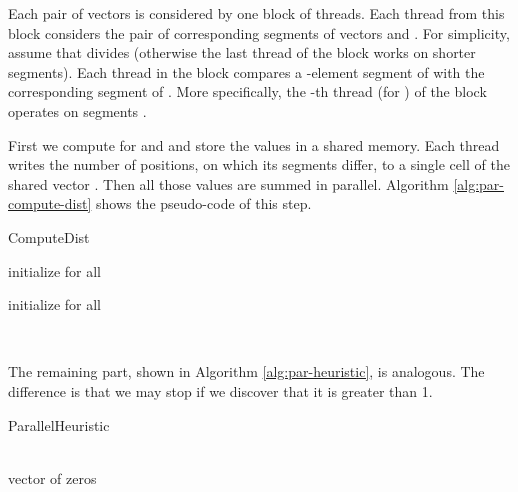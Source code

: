 \documentclass[a4paper]{article}
\begin{document}
Each pair of vectors  is considered by one block of  threads. Each thread from this block considers the pair of corresponding segments of vectors  and .
For simplicity, assume that  divides  (otherwise the last thread of the block works on shorter segments). Each thread in the block compares a -element segment of  with the corresponding segment of . More specifically, the -th thread (for ) of the block operates on segments .

First we compute  for  and  and store the values in a shared memory.
Each thread writes the number of positions, on which its segments differ, to a single cell of the shared vector .
Then all those values are summed in parallel.  
Algorithm \ref{alg:par-compute-dist} shows the pseudo-code of this step.

\begin{algorithm}[htb]
\small
\caption {ComputeDist}
\label{alg:par-compute-dist}

\KwIn{}
initialize  for all \\
{	
	initialize  for all \\
	\TPFor {}
	{		
		\For{ \KwTo }
		{
			\lIf {}{}			
		}
		
	}
	\\
}
\end{algorithm}

The remaining part, shown in Algorithm \ref{alg:par-heuristic}, is analogous. The difference is that we may stop if we discover that it is greater than 1.

\begin{algorithm}[htb]
\small
\caption {ParallelHeuristic}
\label{alg:par-heuristic}

\KwIn{}
\\
 vector of  zeros\\

{
	{
		\TPFor {}
		{
		\\
		\For{ \KwTo }
		{
			\lIf {}{}
			\lIf {}{\Break	}
		}
		\\
		}
		\\
	\For{}
	{
		\\
		\lIf {}{\Break	}
	}
	\lIf{}{\Print }
		}
	}			
\end{algorithm}
\end{document}
